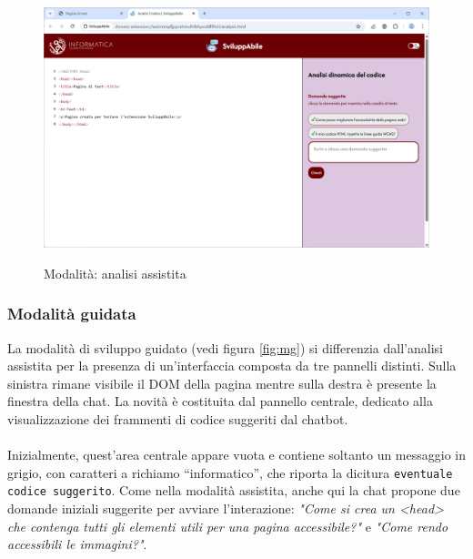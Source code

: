 \begin{figure}[H]
    \centering
    \includegraphics[width=1\linewidth, alt={Modalità di analisi assistita}]{img/analisi_ass.png}
    \caption{Modalità: analisi assistita}\label{fig:aass}
\end{figure}

\subsubsection{Modalità guidata}
\noindent La modalità di sviluppo guidato (vedi figura \ref{fig:mg}) si differenzia dall’analisi assistita per la presenza di un’interfaccia composta da tre pannelli distinti. Sulla sinistra rimane visibile il DOM della pagina mentre sulla destra è presente la finestra della chat. La novità è costituita dal pannello centrale, dedicato alla visualizzazione dei frammenti di codice suggeriti dal chatbot.\\
\\
Inizialmente, quest’area centrale appare vuota e contiene soltanto un messaggio in grigio, con caratteri a richiamo “informatico”, che riporta la dicitura \texttt{eventuale codice suggerito}. Come nella modalità assistita, anche qui la chat propone due domande iniziali suggerite per avviare l’interazione: \textit{"Come si crea un <head> che contenga tutti gli elementi utili per una pagina accessibile?"} e \textit{"Come rendo accessibili le immagini?"}.\\

